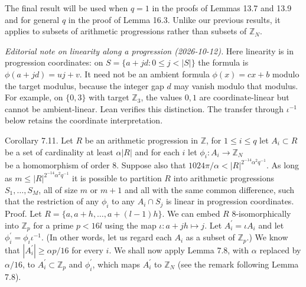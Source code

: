 \documentclass[10pt]{article}
\begin{document}
The final result will be used when $q=1$ in the proofs of Lemmas 13.7 and 13.9 and for general $q$ in the proof of Lemma 16.3. Unlike our previous results, it applies to subsets of arithmetic progressions rather than subsets of $\mathbb{Z}_{N}$.

\emph{Editorial note on linearity along a progression (2026-10-12).}
Here linearity is in progression coordinates: on
$S=\{a+jd:0\leqslant j<|S|\}$ the formula is $\phi(a+jd)=uj+v$.
It need not be an ambient formula $\phi(x)=cx+b$ modulo the target
modulus, because the integer gap $d$ may vanish modulo that modulus.
For example, on $\{0,3\}$ with target $\mathbb Z_3$, the values $0,1$
are coordinate-linear but cannot be ambient-linear. Lean verifies this
distinction. The transfer through $\iota^{-1}$ below retains the
coordinate interpretation.

Corollary 7.11. Let $R$ be an arithmetic progression in $\mathbb{Z}$, for $1 \leqslant i \leqslant q$ let $A_{i} \subset R$ be a set of cardinality at least $\alpha|R|$ and for each $i$ let $\phi_{i}: A_{i} \rightarrow \mathbb{Z}_{N}$\\
be a homomorphism of order 8. Suppose also that $1024\pi/\alpha<|R|^{2^{-14}\alpha^{2}q^{-1}}$. As long as $m \leqslant|R|^{2^{-14} \alpha^{2} q^{-1}}$ it is possible to partition $R$ into arithmetic progressions $S_{1}, \ldots, S_{M}$, all of size $m$ or $m+1$ and all with the same common difference, such that the restriction of any $\phi_{i}$ to any $A_{i} \cap S_{j}$ is linear in progression coordinates.\\
Proof. Let $R=\{a, a+h, \ldots, a+(l-1) h\}$. We can embed $R$ 8-isomorphically into $\mathbb{Z}_{p}$ for a prime $p<16 l$ using the map $\iota: a+j h \mapsto j$. Let $A_{i}^{\prime}=\iota A_{i}$ and let $\phi_{i}^{\prime}=\phi_{i} \iota^{-1}$. (In other words, let us regard each $A_{i}$ as a subset of $\mathbb{Z}_{p}$.) We know that $\left|A_{i}^{\prime}\right| \geqslant \alpha p / 16$ for every $i$. We shall now apply Lemma 7.8, with $\alpha$ replaced by $\alpha / 16$, to $A_{i}^{\prime} \subset \mathbb{Z}_{p}$ and $\phi_{i}^{\prime}$, which maps $A_{i}^{\prime}$ to $\mathbb{Z}_{N}$ (see the remark following Lemma 7.8).
\end{document}
